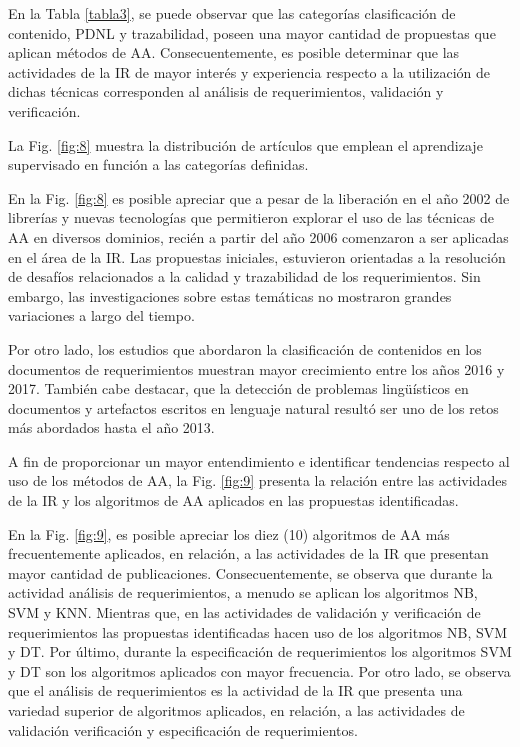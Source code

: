 \documentclass[journal]{IEEEtran}
\begin{document}
En la Tabla \ref{tabla3}, se puede observar que las categorías clasificación de contenido, PDNL y trazabilidad, poseen una mayor cantidad de propuestas que aplican métodos de AA. Consecuentemente, es posible determinar que las actividades de la IR de mayor interés y experiencia respecto a la utilización de dichas técnicas corresponden al análisis de requerimientos, validación y verificación. 

La Fig. \ref{fig:8} muestra la distribución de artículos que emplean el aprendizaje supervisado en función a las categorías definidas.

En la Fig. \ref{fig:8} es posible apreciar que a pesar de la liberación en el año 2002 de librerías y nuevas tecnologías que permitieron explorar el uso de las técnicas de AA en diversos dominios, recién a partir del año 2006 comenzaron a ser aplicadas en el área de la IR. Las propuestas iniciales, estuvieron orientadas a la resolución de desafíos relacionados a la calidad y trazabilidad de los requerimientos. Sin embargo, las investigaciones sobre estas temáticas no mostraron grandes variaciones a largo del tiempo. 

Por otro lado, los estudios que abordaron la clasificación de contenidos en los documentos de requerimientos muestran mayor crecimiento entre los años 2016 y 2017. También cabe destacar, que la detección de problemas lingüísticos en documentos y artefactos escritos en lenguaje natural resultó ser uno de los retos más abordados hasta el año 2013.

A fin de proporcionar un mayor entendimiento e identificar tendencias respecto al uso de los métodos de AA, la Fig. \ref{fig:9} presenta la relación entre las actividades de la IR y los algoritmos de AA aplicados en las propuestas identificadas.

En la Fig. \ref{fig:9}, es posible apreciar los diez (10) algoritmos de AA más frecuentemente aplicados, en relación, a las actividades de la IR que presentan mayor cantidad de publicaciones. Consecuentemente, se observa que durante la actividad análisis de requerimientos, a menudo se aplican los algoritmos NB, SVM y KNN. Mientras que, en las actividades de validación y verificación de requerimientos las propuestas identificadas hacen uso de los algoritmos NB, SVM y DT. Por último, durante la especificación de requerimientos los algoritmos SVM y DT son los algoritmos aplicados con mayor frecuencia.  
Por otro lado, se observa que el  análisis de requerimientos es la actividad de la IR que presenta una variedad superior de algoritmos aplicados, en relación, a las actividades de validación verificación y especificación de requerimientos.  
\end{document}

